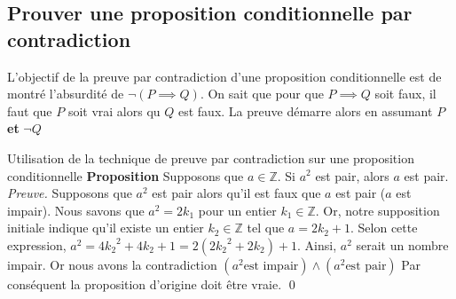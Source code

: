 \documentclass[16pt]{report}
\begin{document}
\begin{multicols*}{2}


            \section{\textbf{\textcolor{myp}{Prouver une proposition conditionnelle par contradiction}}}

                L'objectif de la preuve par contradiction d'une proposition conditionnelle est de montré
                l'absurdité de $ \neg (P \implies Q)$. On sait que pour que $P \implies  Q$ soit faux, il faut que 
                $P$ soit vrai alors qu $Q$ est faux. La preuve démarre alors en assumant $P$ \textbf{et} $\neg Q$ 


            \begin{center}
            \noindent{}
            \end{center}


            \begin{Preuve}{Utilisation de la technique de preuve par contradiction sur une proposition conditionnelle}{}
                \textbf{Proposition} \quad Supposons que $a \in \mathbb{Z}$. Si $a^2$ est pair, alors $a$ est pair.   
                \textit{Preuve.} Supposons que $a^2$ est pair alors qu'il est faux que $a$ est pair ($a$ est impair). 
                Nous savons que $a^2 = 2k_1$ pour un entier $k_1 \in \mathbb{Z}$. Or, notre supposition initiale 
                indique qu'il existe un entier $k_2 \in \mathbb{Z}$ tel que $a = 2k_2 + 1$. Selon cette expression, 
                $a^2 = 4{k_2}^2 + 4k_2 +1 = 2(2{k_2}^2 + 2k_2) + 1$. Ainsi, $a^2$ serait un nombre impair. 
                Or nous avons la contradiction $(a^2 \text{est impair})\land(a^2 \text{est pair})$
                Par conséquent la proposition d'origine doit être vraie. \qed 
            \end{Preuve}



\end{multicols*}
\end{document}
